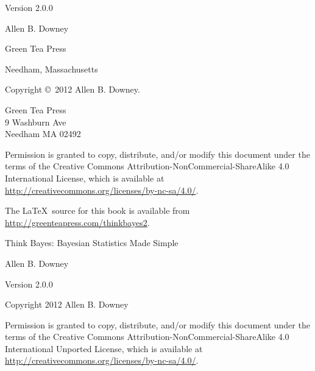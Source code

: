 \documentclass[12pt]{book}
\theoremstyle{exercise}
\newcommand{\thetitle}{Think Bayes}
\newcommand{\thesubtitle}{Bayesian Statistics Made Simple}
\newcommand{\theversion}{2.0.0}
\begin{document}
\begin{latexonly}
\begin{flushright}
\vspace{0.25in}

Version \theversion

\vspace{1in}


{\Large
Allen B. Downey\\
}


\vspace{0.5in}

{\Large Green Tea Press}

{\small Needham, Massachusetts}

\vfill

\end{flushright}


\pagebreak
\thispagestyle{empty}

Copyright \copyright ~2012 Allen B. Downey.


\vspace{0.2in}

\begin{flushleft}
Green Tea Press       \\
9 Washburn Ave \\
Needham MA 02492
\end{flushleft}

Permission is granted to copy, distribute, and/or modify this document
under the terms of the Creative Commons
Attribution-NonCommercial-ShareAlike 4.0 International License, which
is available at
\url{http://creativecommons.org/licenses/by-nc-sa/4.0/}.


The \LaTeX\ source for this book is available from
\url{http://greenteapress.com/thinkbayes2}.

\vspace{0.2in}

\end{latexonly}



\begin{htmlonly}


{\Large \thetitle: \thesubtitle}

{\large Allen B. Downey}

Version \theversion

\vspace{0.25in}

Copyright 2012 Allen B. Downey

\vspace{0.25in}

Permission is granted to copy, distribute, and/or modify this document
under the terms of the Creative Commons 
Attribution-NonCommercial-ShareAlike 4.0 International
Unported License, which is available at
\url{http://creativecommons.org/licenses/by-nc-sa/4.0/}.

\setcounter{chapter}{-1}

\end{htmlonly}
\end{document}
